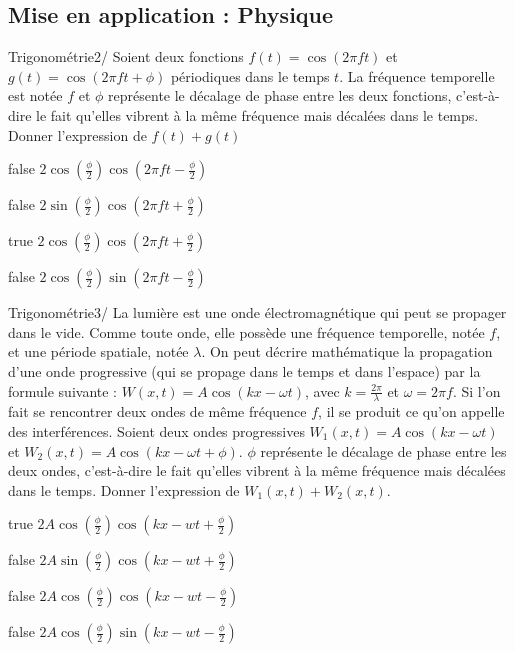 \documentclass[11pt]{article}
\begin{document}
		\subsection{Mise en application : Physique}
        
        
            \begin{question}{47}{Trigonométrie}{2}{/}
				Soient deux fonctions $f(t) = \cos(2\pi f t)$ et $g(t) = \cos(2\pi f t + \phi)$ périodiques dans le temps $t$. La fréquence temporelle est notée $f$ et  $\phi$ représente le décalage de phase entre les deux fonctions, c'est-à-dire le fait qu'elles vibrent à la même fréquence mais décalées dans le temps. Donner l'expression de $f(t) + g(t)$
            \end{question}

            \begin{reponses}
            	\item[false] $2\cos(\frac{\phi}{2})\cos(2\pi ft -\frac{\phi}{2})$
            	\item[false] $2\sin(\frac{\phi}{2})\cos(2\pi ft +\frac{\phi}{2})$
                \item[true] $2\cos(\frac{\phi}{2})\cos(2\pi ft +\frac{\phi}{2})$
                \item[false] $2\cos(\frac{\phi}{2})\sin(2\pi ft -\frac{\phi}{2})$
            \end{reponses}
			
        	\begin{question}{47}{Trigonométrie}{3}{/}
				La lumière est une onde électromagnétique qui peut se propager dans le vide. Comme toute onde, elle possède une fréquence temporelle, notée $f$, et une période spatiale, notée $\lambda$. On peut décrire mathématique la propagation d'une onde progressive (qui se propage dans le temps et dans l'espace) par la formule suivante : $W(x,t) = A\cos(kx - \omega t)$, avec $k=\frac{2\pi}{\lambda}$ et $\omega = 2\pi f$. Si l'on fait se rencontrer deux ondes de même fréquence $f$, il se produit ce qu'on appelle des interférences. Soient deux ondes progressives $W_1(x,t) = A\cos(kx - \omega t)$ et $W_2(x,t) = A\cos(kx - \omega t + \phi)$. $\phi$ représente le décalage de phase entre les deux ondes, c'est-à-dire le fait qu'elles vibrent à la même fréquence mais décalées dans le temps. Donner l'expression de $W_1(x,t) + W_2(x,t)$.
            \end{question}

            \begin{reponses}
            	\item[true] $2A\cos(\frac{\phi}{2})\cos(kx -wt +\frac{\phi}{2})$
            	\item[false] $2A\sin(\frac{\phi}{2})\cos(kx -wt +\frac{\phi}{2})$
                \item[false] $2A\cos(\frac{\phi}{2})\cos(kx -wt -\frac{\phi}{2})$
                \item[false] $2A\cos(\frac{\phi}{2})\sin(kx -wt -\frac{\phi}{2})$
            \end{reponses}
			
\end{document}
